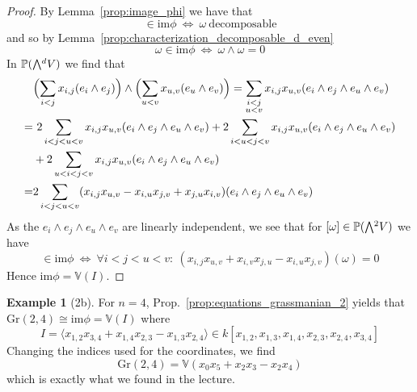 \documentclass{scrartcl}
\newcommand{\V}{\mathbb{V}}
\newcommand{\Proj}{\mathbb{P}}
\newcommand{\Gr}{\mathrm{Gr}}
\newcommand{\extpow}{\mathchoice{{\textstyle\bigwedge}}
    {{\bigwedge}}
    {{\textstyle\wedge}}
    {{\scriptstyle\wedge}}}
\theoremstyle{definition}
\newtheorem{example}[definition]{Example}
\begin{document}
\begin{proof}
    By Lemma~\ref{prop:image_phi} we have that
    \begin{equation*}
        [\omega] \in \mathrm{im}\phi \ \Leftrightarrow \ \omega\ \text{decomposable}
    \end{equation*}
    and so by Lemma~\ref{prop:characterization_decomposable_d_even}
    \begin{equation*}
        \omega \in \mathrm{im}\phi \ \Leftrightarrow \ \omega \wedge \omega = 0
    \end{equation*}
    In $\Proj(\extpow^d V)$ we find that
    \begin{align*}
        &\Bigl( \sum_{i < j} x_{i, j} (e_i \wedge e_j) \Bigr) \wedge \Bigl( \sum_{u < v} x_{u, v} (e_u \wedge e_v) \Bigr) = \sum_{\substack{i < j\\u < v}} x_{i, j} x_{u, v} (e_i \wedge e_j \wedge e_u \wedge e_v) \\
        =& \ 2\sum_{\substack{i < j < u < v}} x_{i, j} x_{u, v} (e_i \wedge e_j \wedge e_u \wedge e_v) + 2\sum_{\substack{i < u < j < v}} x_{i, j} x_{u, v} (e_i \wedge e_j \wedge e_u \wedge e_v) \\
        &+ 2\sum_{\substack{u < i < j < v}} x_{i, j} x_{u, v} (e_i \wedge e_j \wedge e_u \wedge e_v) \\
        =&2 \sum_{i < j < u < v} (x_{i, j} x_{u, v} - x_{i, u} x_{j, v} + x_{j, u} x_{i, v}) (e_i \wedge e_j \wedge e_u \wedge e_v)
    \end{align*}
    As the $e_i \wedge e_j \wedge e_u \wedge e_v$ are linearly independent, we see that for $[\omega] \in \Proj(\extpow^2 V)$ we have
    \begin{equation*}
        [\omega] \in \mathrm{im}\phi \ \Leftrightarrow \ \forall i < j < u < v: \ (x_{i, j} x_{u, v} + x_{i, v} x_{j, u} - x_{i, u} x_{j, v})(\omega) = 0
    \end{equation*}
    Hence $\mathrm{im}\phi = \V(I)$.
\end{proof}
\begin{example}[2b]
    For $n = 4$, Prop.~\ref{prop:equations_grassmanian_2} yields that $\Gr(2, 4) \cong \mathrm{im}\phi = \V(I)$ where
    \begin{equation*}
        I = \langle x_{1, 2} x_{3, 4} + x_{1, 4} x_{2, 3} - x_{1, 3} x_{2, 4} \rangle \in k[x_{1, 2}, x_{1, 3}, x_{1, 4}, x_{2, 3}, x_{2, 4}, x_{3, 4}]
    \end{equation*}
    Changing the indices used for the coordinates, we find
    \begin{equation*}
        \Gr(2, 4) = \V(x_0 x_5 + x_2 x_3 - x_2 x_4)
    \end{equation*}
    which is exactly what we found in the lecture.
\end{example}
\end{document}
